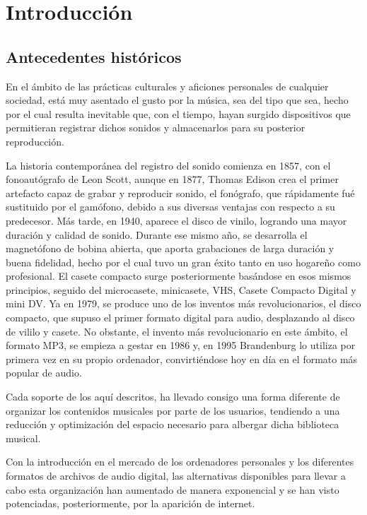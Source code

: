 \chapter{Introducción}

\section{Antecedentes históricos}

En el ámbito de las prácticas culturales y aficiones personales de cualquier sociedad, está muy asentado el gusto por la música, sea del tipo que sea, hecho por el cual resulta inevitable que, con el tiempo, hayan surgido dispositivos que permitieran registrar dichos sonidos y almacenarlos para su posterior reproducción.

La historia contemporánea del registro del sonido comienza en 1857, con el fonoautógrafo de Leon Scott, aunque en 1877, Thomas Edison crea el primer artefacto capaz de grabar y reproducir sonido, el fonógrafo, que rápidamente fué sustituido por el gamófono, debido a sus diversas ventajas con respecto a su predecesor. Más tarde, en 1940, aparece el disco de vinilo, logrando una mayor duración y calidad de sonido. Durante ese mismo año, se desarrolla el magnetófono de bobina abierta, que aporta grabaciones de larga duración y buena fidelidad, hecho por el cual tuvo un gran éxito tanto en uso hogareño como profesional. El casete compacto surge posteriormente basándose en esos mismos principios, seguido del microcasete, minicasete, VHS, Casete Compacto Digital y mini DV. Ya en 1979, se produce uno de los inventos más revolucionarios, el disco compacto, que supuso el primer formato digital para audio, desplazando al disco de vililo y casete. No obstante, el invento más revolucionario en este ámbito, el formato MP3, se empieza a gestar en 1986 y, en 1995 Brandenburg lo utiliza por primera vez en su propio ordenador, convirtiéndose hoy en día en el formato más popular de audio.

Cada soporte de los aquí descritos, ha llevado consigo una forma diferente de organizar los contenidos musicales por parte de los usuarios, tendiendo a una reducción y optimización del espacio necesario para albergar dicha biblioteca musical. 

Con la introducción en el mercado de los ordenadores personales y los diferentes formatos de archivos de audio digital, las alternativas disponibles para llevar a cabo esta organización han aumentado de manera exponencial y se han visto potenciadas, posteriormente, por la aparición de internet.

